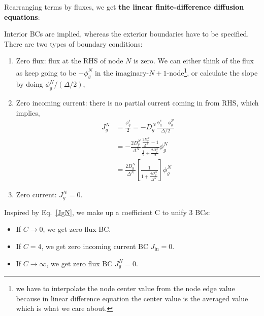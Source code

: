 \documentclass{school-22.211-notes}
\begin{document}
Rearranging terms by fluxes, we get \textbf{the linear finite-difference diffusion equations}:
\small
{} 
\normalsize

Interior BCs are implied, whereas the exterior boundaries have to be specified. There are two types of boundary conditions:
\begin{enumerate}
\item Zero flux: flux at the RHS of node $N$ is zero.  We can either think of the flux as keep going to be $-\phi_g^N$ in the imaginary-$N+1$-node\footnote{we have to interpolate the node center value from the node edge value because in linear difference equation the center value is the averaged value which is what we care about.}, or calculate the slope by doing $\phi_g^N / (\Delta /2)$,
\item Zero incoming current: there is no partial current coming in from RHS,
which implies,
\begin{align}
  J_g^N &= \frac{\phi_g^s}{2} = -D_g^N \frac{\phi_g^s - \phi_g^N}{\Delta/2} \\
  &= - \frac{2 D_g^N}{\Delta^N} \frac{\frac{2D_g^N}{\Delta^N} - 1}{\frac{1}{2} + \frac{2D_g^N}{\Delta}} \phi_g^N \\
  &= \frac{2D_g^N}{\Delta^N} \left[ \frac{1}{1 + \frac{4 D_g^{N}}{\Delta^N}} \right] \phi_g^N  \label{JgN}
\end{align}
\item Zero current: $J_g^N = 0$. 
\end{enumerate}

Inspired by Eq.~\ref{JgN}, we make up a coefficient C to unify 3 BCs: 
\begin{itemize}
\item If $C \to 0$, we get zero flux BC.  
\item If $C = 4$, we get zero incoming current BC $J_{\mathrm{in}} = 0$.
\item If $C \to \infty$, we get zero flux BC $J_g^N = 0$. 
\end{itemize}
\end{document}
